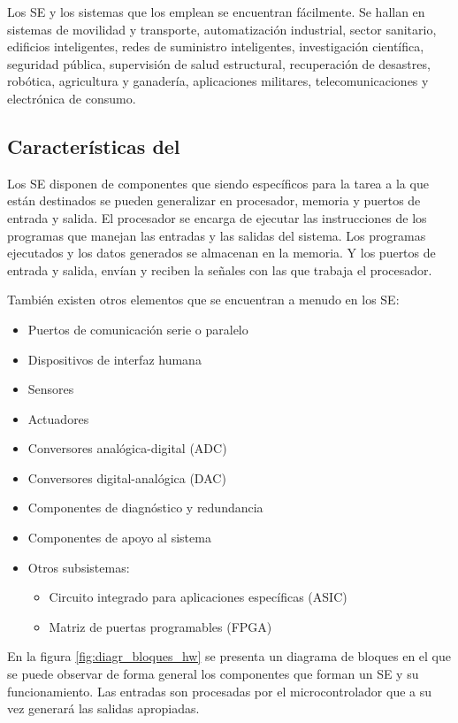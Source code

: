 Los SE y los sistemas que los emplean se encuentran fácilmente. Se hallan en 
sistemas de movilidad y transporte, automatización industrial, sector sanitario,
edificios inteligentes, redes de suministro inteligentes, investigación
científica, seguridad pública, supervisión de salud estructural, recuperación de
desastres, robótica, agricultura y ganadería, aplicaciones militares,
telecomunicaciones y electrónica de consumo. \cite{marw18}

\subsection{Características del }
Los SE disponen de componentes  que siendo específicos
para la tarea a la que están destinados se pueden generalizar en procesador,
memoria y puertos de entrada y salida. El procesador se encarga de ejecutar las
instrucciones de los programas que manejan las entradas y las salidas del
sistema. Los programas ejecutados y los datos generados se almacenan en la
memoria. Y los puertos de entrada y salida, envían y reciben la señales con las
que trabaja el procesador.\cite{jime13}

También existen otros elementos que se encuentran a menudo en los SE:
\begin{itemize}
    \item Puertos de comunicación serie o paralelo
    \item Dispositivos de interfaz humana
    \item Sensores
    \item Actuadores
    \item Conversores analógica-digital (ADC)
    \item Conversores digital-analógica (DAC)
    \item Componentes de diagnóstico y redundancia
    \item Componentes de apoyo al sistema
    \item Otros subsistemas:
    \begin{itemize}
        \item Circuito integrado para aplicaciones específicas (ASIC)
        \item Matriz de puertas programables (FPGA)
    \end{itemize}
\end{itemize}

En la figura \ref{fig:diagr_bloques_hw} se presenta un diagrama de bloques
en el que se puede observar de forma general los componentes que forman un SE
y su funcionamiento. Las entradas son procesadas por el microcontrolador que a
su vez generará las salidas apropiadas. 


